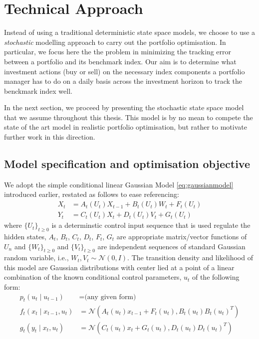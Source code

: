 \section{Technical Approach}
Instead of using a traditional deterministic state space models, we choose to use a \emph{stochastic} modelling approach to carry out the portfolio optimisation. In particular, we focus here the the problem in minimizing the tracking error between a portfolio and its benchmark index.  Our aim is to determine what investment actions (buy or sell) on the necessary index components a portfolio manager has to do on a daily basis across the investment horizon to track the benckmark index well.

In the next section, we proceed by presenting the stochastic state space model that we assume throughout this thesis. This model is by no mean to compete the state of the art model in realistic portfolio optimisation, but rather to motivate further work in this direction.
 
\subsection{Model specification and optimisation objective}
We adopt the simple conditional linear Gaussian Model \eqref{eq:gaussianmodel} introduced earlier, restated as follows to ease referencing:
\begin{align}
  X_t &= A_t(U_t)X_{t-1} + B_t(U_t)W_t + F_t(U_t) \nonumber \\
  Y_t &= C_t(U_t)X_t + D_t(U_t)V_t + G_t(U_t)
\label{eq:model}
\end{align}
where $\{U_t\}_{t \geq 0}$ is a determinstic control input sequence that is used regulate the hidden states, $A_t$, $B_t$, $C_t$, $D_t$, $F_t$, $G_t$ are appropriate matrix/vector functions of $U_n$ and  $\{W_t\}_{t \geq 0}$ and  $\{V_t\}_{t \geq 0}$ are independent sequences of standard Gaussian random variable, i.e., $W_t, V_t \sim \mathcal{N}(0,I)$. The transition density and likelihood of this model are Gaussian distributions with center lied at a point of a linear combination of the known conditional control parameters, $u_t$ of the following form:
\begin{align}
  p_t(u_t \mid u_{t-1}) &= \textrm{(any given form)} \nonumber \\
  f_t(x_t \mid x_{t-1}, u_t) &= \mathcal{N}(A_t(u_t) x_{t-1} + F_t(u_t), B_t(u_t)B_t(u_t)^T) \nonumber \\
  g_t(y_t \mid x_t, u_t)    &= \mathcal{N}(C_t(u_t) x_t + G_t(u_t), D_t(u_t)D_t(u_t)^T)
\end{align}
 
